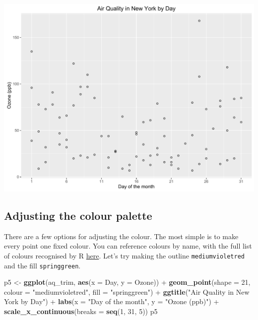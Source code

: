 \documentclass[]{article}
\newenvironment{Shaded}{\begin{snugshade}}{\end{snugshade}}
\newcommand{\KeywordTok}[1]{\textcolor[rgb]{0.13,0.29,0.53}{\textbf{{#1}}}}
\newcommand{\DataTypeTok}[1]{\textcolor[rgb]{0.13,0.29,0.53}{{#1}}}
\newcommand{\DecValTok}[1]{\textcolor[rgb]{0.00,0.00,0.81}{{#1}}}
\newcommand{\StringTok}[1]{\textcolor[rgb]{0.31,0.60,0.02}{{#1}}}
\newcommand{\NormalTok}[1]{{#1}}
\begin{document}
\begin{center}\includegraphics{0_all_posts_pdf/scatter_4-1} \end{center}

\subsection{Adjusting the colour
palette}\label{adjusting-the-colour-palette}

There are a few options for adjusting the colour. The most simple is to
make every point one fixed colour. You can reference colours by name,
with the full list of colours recognised by R
\href{http://www.stat.columbia.edu/~tzheng/files/Rcolor.pdf}{here}.
Let's try making the outline \texttt{mediumvioletred} and the fill
\texttt{springgreen}.

\begin{Shaded}
\begin{Highlighting}[]
\NormalTok{p5 <-}\StringTok{ }\KeywordTok{ggplot}\NormalTok{(aq_trim, }\KeywordTok{aes}\NormalTok{(}\DataTypeTok{x =} \NormalTok{Day, }\DataTypeTok{y =} \NormalTok{Ozone)) +}\StringTok{ }
\StringTok{      }\KeywordTok{geom_point}\NormalTok{(}\DataTypeTok{shape =} \DecValTok{21}\NormalTok{, }\DataTypeTok{colour =} \StringTok{"mediumvioletred"}\NormalTok{, }\DataTypeTok{fill =} \StringTok{"springgreen"}\NormalTok{) +}
\StringTok{      }\KeywordTok{ggtitle}\NormalTok{(}\StringTok{"Air Quality in New York by Day"}\NormalTok{) +}\StringTok{ }
\StringTok{      }\KeywordTok{labs}\NormalTok{(}\DataTypeTok{x =} \StringTok{"Day of the month"}\NormalTok{, }\DataTypeTok{y =} \StringTok{"Ozone (ppb)"}\NormalTok{) +}
\StringTok{      }\KeywordTok{scale_x_continuous}\NormalTok{(}\DataTypeTok{breaks =} \KeywordTok{seq}\NormalTok{(}\DecValTok{1}\NormalTok{, }\DecValTok{31}\NormalTok{, }\DecValTok{5}\NormalTok{)) }
\NormalTok{p5}
\end{Highlighting}
\end{Shaded}
\end{document}
